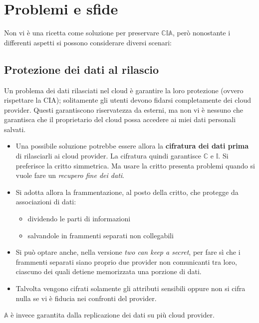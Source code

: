 \section{Problemi e sfide}
Non vi è una ricetta come soluzione per preservare $\mathbb{CIA}$, però nonostante i differenti aspetti si possono considerare diversi scenari:
\subsection{Protezione dei dati al rilascio}
Un problema dei dati rilasciati nel cloud è garantire la loro protezione (ovvero rispettare la CIA); solitamente gli utenti devono fidarsi completamente dei cloud provider. Questi garantiscono riservatezza da esterni, ma non vi è nessuno che garantisca che il proprietario del cloud possa accedere ai miei dati personali salvati.
\begin{itemize}
    \item Una possibile soluzione potrebbe essere allora la \textbf{cifratura dei dati prima} di rilasciarli ai cloud provider. La cifratura quindi garantisce $\mathbb{C}$ e $\mathbb{I}$. Si preferisce la critto simmetrica. Ma usare la critto presenta problemi quando si vuole fare un \textit{recupero fine dei dati}.
    \item Si adotta allora la frammentazione, al posto della critto, che protegge da associazioni di dati:
    \begin{itemize}
        \item dividendo le parti di informazioni
        \item salvandole in frammenti separati non collegabili
    \end{itemize}
    \item Si può optare anche, nella versione \textit{two can keep a secret}, per fare sì che i frammenti separati siano proprio due provider non comunicanti tra loro, ciascuno dei quali detiene memorizzata una porzione di dati.
    \item Talvolta vengono cifrati solamente gli attributi sensibili oppure non si cifra nulla se vi è fiducia nei confronti del provider.
\end{itemize}
$\mathbb{A}$ è invece garantita dalla replicazione dei dati su più cloud provider.

